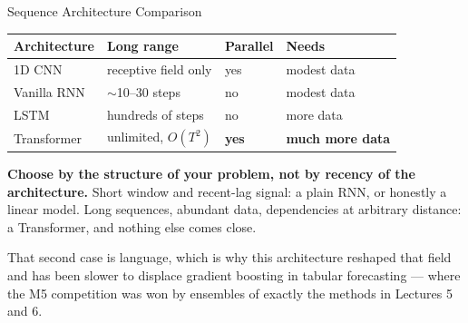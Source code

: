 \documentclass[aspectratio=169, 11pt]{beamer}
\begin{document}

\begin{frame}{Sequence Architecture Comparison}
  \begin{center}
    {\small
    \begin{tabular}{llll}
      \toprule
      \textbf{Architecture} & \textbf{Long range} & \textbf{Parallel} & \textbf{Needs} \\
      \midrule
      1D CNN & receptive field only & yes & modest data \\
      Vanilla RNN & $\sim$10--30 steps & no & modest data \\
      LSTM & hundreds of steps & no & more data \\
      Transformer & unlimited, $O(T^2)$ & \textbf{yes} & \textbf{much more data} \\
      \bottomrule
    \end{tabular}
    }
  \end{center}

  \vspace{0.15cm}
  \textbf{Choose by the structure of your problem, not by recency of the architecture.} Short
  window and recent-lag signal: a plain RNN, or honestly a linear model. Long sequences, abundant
  data, dependencies at arbitrary distance: a Transformer, and nothing else comes close.

  \vspace{0.15cm}
  That second case is language, which is why this architecture reshaped that field and has been
  slower to displace gradient boosting in tabular forecasting --- where the M5 competition was won
  by ensembles of exactly the methods in Lectures 5 and 6.
\end{frame}
\end{document}
